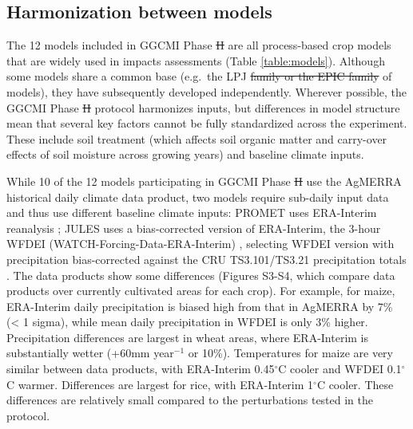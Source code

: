 \documentclass[gmd, manuscript]{copernicus} %
\providecommand{\DIFadd}[1]{{\protect\color{blue}\uwave{#1}}} %
\providecommand{\DIFdel}[1]{{\protect\color{red}\sout{#1}}}                      %
\providecommand{\DIFaddbegin}{} %
\providecommand{\DIFaddend}{} %
\providecommand{\DIFdelbegin}{} %
\providecommand{\DIFdelend}{} %
\begin{document}
\subsection{Harmonization between models}
The 12 models included in GGCMI Phase \DIFdelbegin \DIFdel{II }\DIFdelend \DIFaddbegin \DIFadd{2 }\DIFaddend are all process-based crop models that are widely used in impacts assessments (Table \ref{table:models}).
Although some models share a common base (e.g.\ the LPJ \DIFdelbegin \DIFdel{family or the EPIC family }\DIFdelend \DIFaddbegin \DIFadd{or EPIC families }\DIFaddend of models), they have subsequently developed independently.  
Wherever possible, the GGCMI Phase \DIFdelbegin \DIFdel{II }\DIFdelend \DIFaddbegin \DIFadd{2 }\DIFaddend protocol harmonizes inputs, but differences in model structure mean that several key factors cannot be fully standardized across the experiment. 
These include soil treatment (which affects soil organic matter and carry-over effects of soil moisture across growing years) and baseline climate inputs.  

While 10 of the 12 models participating in GGCMI Phase \DIFdelbegin \DIFdel{II }\DIFdelend \DIFaddbegin \DIFadd{2 }\DIFaddend use the AgMERRA historical daily climate data product, two models require sub-daily input data and thus use different baseline climate inputs:
PROMET uses ERA-Interim reanalysis \citep{dee2011era}; JULES uses a bias-corrected version of ERA-Interim, the 3-hour WFDEI (WATCH-Forcing-Data-ERA-Interim) \citep{weedon2014wfdei}, selecting WFDEI version with precipitation bias-corrected against the CRU TS3.101/TS3.21 precipitation totals \citep{harris_cru_2014}.
The data products show some differences (Figures S3-S4, which compare data products over currently cultivated areas for each crop). 
For example, for maize, ERA-Interim daily precipitation is biased high from that in AgMERRA by 7\% (< 1 sigma), while mean daily precipitation in WFDEI is only 3\% higher. 
Precipitation differences are largest in wheat areas, where ERA-Interim is substantially wetter (+60mm year$^{-1}$ or 10\%). 
Temperatures for maize are very similar between data products, with ERA-Interim 0.45$^\circ$C cooler and WFDEI 0.1$^\circ$C warmer. 
Differences are largest for rice, with ERA-Interim 1$^\circ$C cooler. 
These differences are relatively small compared to the perturbations tested in the protocol.
\end{document}
